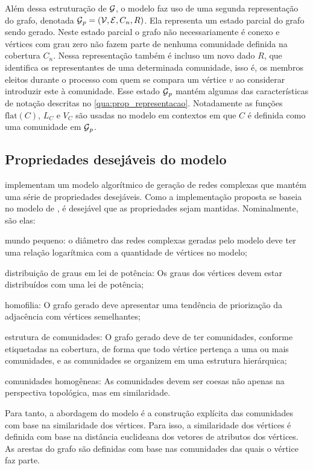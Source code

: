 \documentclass[notes.tex]{subfiles}
\begin{document}
Além dessa estruturação de $\operatorname{\mathcal{G}}$, o modelo faz uso de uma segunda representação do grafo, denotada  $\operatorname{\mathcal{G}}_p = (\operatorname{\mathcal{V}}, \operatorname{\mathcal{E}}, C_n, R)$.
Ela representa um estado parcial do grafo sendo gerado.
Neste estado parcial o grafo não necessariamente é conexo e vértices com grau zero não fazem parte de nenhuma comunidade definida na cobertura $C_n$.
Nessa representação também é incluso um novo dado $R$, que identifica os representantes de uma determinada comunidade, isso é, os membros eleitos durante o processo com quem se compara um vértice $v$ ao considerar introduzir este à comunidade.
Esse estado $\operatorname{\mathcal{G}}_p$ mantém algumas das características de notação descritas no \autoref{qua:prop_representacao}.
Notadamente as funções $\text{flat}(C)$, $L_C$ e $V_C$ são usadas no modelo em contextos em que  $C$ é definida como uma comunidade em $\operatorname{\mathcal{G}}_p$.

\subsection{Propriedades desejáveis do modelo}

 implementam um modelo algorítmico de geração de redes complexas que mantém uma série de propriedades desejáveis.
Como a implementação proposta se baseia no modelo de , é desejável que as propriedades sejam mantidas.
Nominalmente, são elas:

\begin{alineas}
    \item mundo pequeno: o diâmetro das redes complexas geradas pelo modelo deve ter uma relação logarítmica com a quantidade de vértices no modelo;
    \item distribuição de graus em lei de potência: Os graus dos vértices devem estar distribuídos com uma lei de potência;
    \item homofilia: O grafo gerado deve apresentar uma tendência de priorização da adjacência com vértices semelhantes;
    \item estrutura de comunidades: O grafo gerado deve de ter comunidades, conforme etiquetadas na cobertura, de forma que todo vértice pertença a uma ou mais comunidades, e as comunidades se organizem em uma estrutura hierárquica;
    \item comunidades homogêneas: As comunidades devem ser coesas não apenas na perspectiva topológica, mas em similaridade.
\end{alineas}

Para tanto, a abordagem do modelo é a construção explícita das comunidades com base na similaridade dos vértices.
Para isso, a similaridade dos vértices é definida com base na distância euclideana dos vetores de atributos dos vértices.
As arestas do grafo são definidas com base nas comunidades das quais o vértice faz parte.
\end{document}

